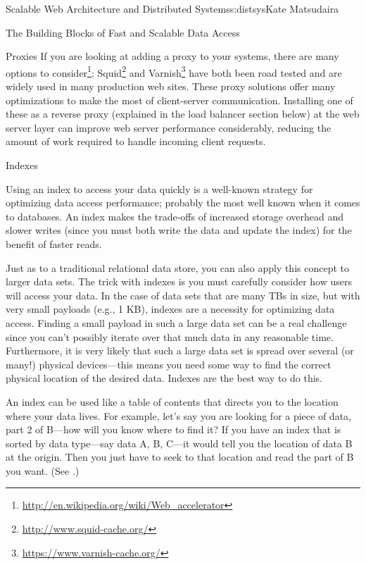 \begin{aosachapter}{Scalable Web Architecture and Distributed Systems}{s:distsys}{Kate Matsudaira}
\begin{aosasect1}{The Building Blocks of Fast and Scalable Data Access}
\begin{aosasect2}{Proxies}
If you are looking at adding a proxy to your systems, there are many
options to
consider\footnote{\url{http://en.wikipedia.org/wiki/Web_accelerator}};
Squid\footnote{\url{http://www.squid-cache.org/}} and
Varnish\footnote{\url{https://www.varnish-cache.org/}} have both been
road tested and are widely used in many production web sites. These
proxy solutions offer many optimizations to make the most of
client-server communication. Installing one of these as a reverse
proxy (explained in the load balancer section below) at the web server
layer can improve web server performance considerably, reducing the
amount of work required to handle incoming client requests.

\end{aosasect2}

\begin{aosasect2}{Indexes}

Using an index to access your data quickly is a well-known strategy
for optimizing data access performance; probably the most well known 
when it comes to databases. An index makes the trade-offs of
increased storage overhead and slower writes (since you must both
write the data and update the index) for the benefit of faster reads.

Just as to a traditional relational data store, you can also apply
this concept to larger data sets. The trick with indexes is you must
carefully consider how users will access your data. In the case of
data sets that are many TBs in size, but with very small payloads
(e.g., 1 KB), indexes are a necessity for optimizing data
access. Finding a small payload in such a large data set can be a real
challenge since you can't possibly iterate over that much data in any
reasonable time. Furthermore, it is very likely that such a large data
set is spread over several (or many!) physical devices---this means
you need some way to find the correct physical location of the desired
data. Indexes are the best way to do this. 

An index can be used like a table of contents that directs you to the
location where your data lives. 
For example, let's say you are looking for a
piece of data, part 2 of B---how will you know where to find it? If
you have an index that is sorted by data type---say data A, B, C---it
would tell you the location of data B at the origin. Then you just
have to seek to that location and read the part of B you want. 
(See .)



\end{aosasect2}
\end{aosasect1}
\end{aosachapter}
